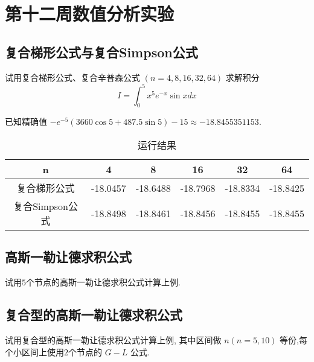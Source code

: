 \section{第十二周数值分析实验}
\subsection{复合梯形公式与复合Simpson公式}
\begin{ex}
	试用复合梯形公式、复合辛普森公式 $(n=4,8,16,32,64)$ 求解积分
	$$
	I=\int_0^5 x^5 e^{-x} \sin x d x
	$$
	
	已知精确值 $-e^{-5}(3660 \cos 5+487.5 \sin 5)-15 \approx-18.8455351153$.
\end{ex}

\qa 
\begin{table}[htbp]
	\centering
	\caption{运行结果}
	\begin{tabular}{c|ccccc}
		n     & 4     & 8     & 16    & 32    & 64 \\
		\hline
		复合梯形公式 & -18.0457 & -18.6488 & -18.7968 & -18.8334 & -18.8425 \\
		复合Simpson公式 & -18.8498 & -18.8461 & -18.8456 & -18.8455 & -18.8455 \\
	\end{tabular}%
	\label{tab:addlabel12}%
\end{table}%

\subsection{高斯一勒让德求积公式}
\begin{ex}
	试用$5$个节点的高斯一勒让德求积公式计算上例.
\end{ex}

\subsection{复合型的高斯一勒让德求积公式}
\begin{ex}
	试用复合型的高斯一勒让德求积公式计算上例, 其中区间做 $n(n=5,10)$ 等份,每个小区间上使用$2$个节点的 $G-L$ 公式.
\end{ex}

\qa [-18.8454781687866,-18.8455360298194]